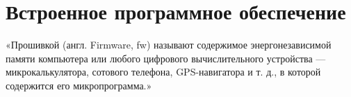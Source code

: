 \section{Встроенное программное обеспечение}
«Прошивкой (англ. Firmware, fw) называют содержимое энергонезависимой памяти компьютера или любого цифрового вычислительного устройства — микрокалькулятора, сотового телефона, GPS-навигатора и т. д., в которой содержится его микропрограмма.» \cite{wiki}



